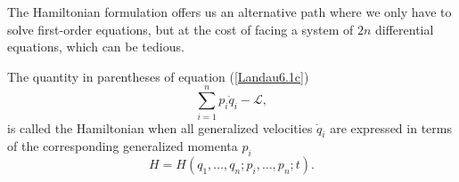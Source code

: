 \documentclass[12pt, english, a4paper]{article}
\begin{document}
The Hamiltonian formulation offers us an alternative path where we only have to solve first-order equations, but at the cost of facing a system of \(2n\) differential equations, which can be tedious.

The quantity in parentheses of equation (\ref{Landau6.1c})
\begin{equation}\label{Lanczos62.3}
	\sum_{i=1}^n p_i \dot{q}_i - \mathcal{L} ,
    \tag{Lanczos 62.3}
\end{equation}
is called the Hamiltonian when all generalized velocities \(\dot{q}_i\) are expressed in terms of the corresponding generalized momenta \(p_i\)
\begin{equation}\label{Lanczos62.4}
	H =  H(q_1,\ldots, q_n;p_i, \ldots, p_n; t) .
    \tag{Lanczos 62.4}
\end{equation}
\end{document}
